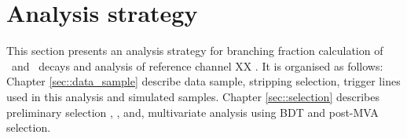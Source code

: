 \section{Analysis strategy}\label{analysis_strategy}

This section presents an analysis strategy for branching fraction calculation of  \Bs~\to\Dss\KS\pim and \Bs~\to\Dss\Kstarm decays and analysis of reference channel XX . It is organised as follows: Chapter \ref{sec::data_sample} describe data sample, stripping selection, trigger lines used in this analysis and simulated samples. Chapter \ref{sec::selection} describes preliminary selection \Ds, \KS, and\Dstar, multivariate analysis using BDT and post-MVA selection. 